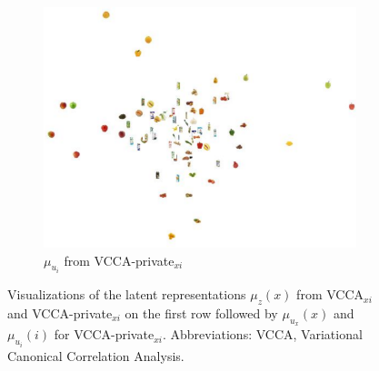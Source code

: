 \begin{figure}[p]
\begin{minipage}{0.8\textwidth}
\begin{subfigure}[t]{0.75\textwidth}
	    	\includegraphics[width=\textwidth]{PaperB/appendix/figures/vcca_private_xi/vcca_private_xi_ui_space.pdf}
	    	\caption{$\mu_{u_{i}}$ from VCCA-private$_{x i}$}
	    	\label{fig:pca_vcca_private_xi_ui}
	    \end{subfigure}
    \end{minipage}
    \caption{Visualizations of the latent representations $\mu_{z}(x)$ from VCCA$_{x i}$ and VCCA-private$_{x i}$ on the first row followed by $\mu_{u_{x}}(x)$ and $\mu_{u_{i}}(i)$ for VCCA-private$_{x i}$. Abbreviations: VCCA, Variational Canonical Correlation Analysis.}
    \label{fig:2d_visualizations_pca_vcca_private_xi}
\end{figure}

\clearpage

